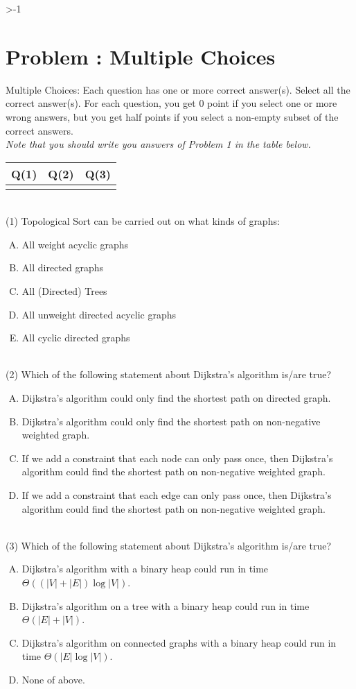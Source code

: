 \documentclass[10.5pt]{article}
\newcounter{ProblemCounter}
\newcounter{oldvalue}
\newcommand{\problem}[2][-1]{
    	\setcounter{oldvalue}{\value{secnumdepth}}
    	\setcounter{secnumdepth}{0}
    	\ifnum#1>-1
    		\setcounter{ProblemCounter}{0}
    	\else
    		\stepcounter{ProblemCounter}
    	\fi
    	\section{Problem \arabic{ProblemCounter}: #2}
    	\setcounter{secnumdepth}{\value{oldvalue}}
    }
\begin{document}
\problem{Multiple Choices}
Multiple Choices: Each question has one or more correct answer(s). Select all the correct answer(s). For each question, you get $0$ point if you select one or more wrong answers, but you get half points if you select a non-empty subset of the correct answers.\\
\textit{Note that you should write you answers of Problem 1 in the table below.}
\begin{table}[htbp]
	\begin{tabular}{|p{1.5cm}|p{1.5cm}|p{1.5cm}|}
	\hline 
	Q(1) & Q(2) & Q(3) \\
	\hline 
	\color{brown}&\color{brown}&\color{brown}\\ 
	\hline 
	\end{tabular} 
\end{table} \\
(1) Topological Sort can be carried out on what kinds of graphs:
\begin{enumerate}[(A)]
	\item All weight acyclic graphs
	\item All directed graphs
	\item All (Directed) Trees
	\item All unweight directed acyclic graphs
	\item All cyclic directed graphs
\end{enumerate}
~\\
(2) Which of the following statement about Dijkstra's algorithm is/are true?
\begin{enumerate}[(A)]
	\item Dijkstra's algorithm could only find the shortest path on directed graph.
	\item Dijkstra's algorithm could only find the shortest path on non-negative weighted graph.
	\item If we add a constraint that each node can only pass once, then Dijkstra's algorithm could find the shortest path on non-negative weighted graph.
	\item If we add a constraint that each edge can only pass once, then Dijkstra's algorithm could find the shortest path on non-negative weighted graph.
\end{enumerate}
~\\
(3) Which of the following statement about Dijkstra's algorithm is/are true?
\begin{enumerate}[(A)]
	\item  Dijkstra's algorithm with a binary heap could run in time $ \Theta ((|V|+|E|)\log |V|)$.
	\item  Dijkstra's algorithm on a tree with a binary heap could run in time $ {\Theta (|E|+|V|)}$.
	\item Dijkstra's algorithm on connected graphs with a binary heap could run in time $ \Theta (|E|\log |V|)$.
	\item None of above.
\end{enumerate}
\end{document}
